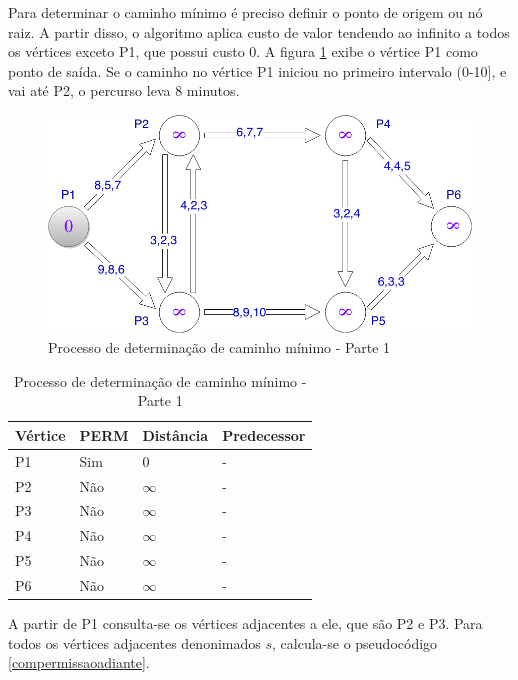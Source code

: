 Para determinar o caminho mínimo é preciso definir o ponto de origem ou nó raiz. A partir disso, o algoritmo
aplica custo de valor tendendo ao infinito a todos os vértices exceto P1, que possui custo 0. A figura \ref{fig:leo2} exibe
o vértice P1 como ponto de saída. Se o caminho no vértice P1 iniciou no primeiro intervalo (0-10], e vai
até P2, o percurso leva 8 minutos.

\begin{figure}[htbp]
\centering
 \includegraphics[width=.50\textwidth]{figuras/leo2.png}
\caption{Processo de determinação de caminho mínimo - Parte 1}
\label{fig:leo2}
\end{figure}

\begin{table}[htbp]
  \centering
  \begin{tabular}{l l l l}
  \toprule
  Vértice & PERM & Distância & Predecessor\\
  \midrule
  P1 & Sim & 0 & - \\
  P2 & Não & $\infty$ & - \\
  P3 & Não & $\infty$ & - \\
  P4 & Não & $\infty$ & - \\
  P5 & Não & $\infty$ & - \\
  P6 & Não & $\infty$ & - \\
  \bottomrule
  \end{tabular}
\caption{Processo de determinação de caminho mínimo - Parte 1}
 \label{tab:leotab1}
\end{table}
\FloatBarrier

A partir de P1 consulta-se os vértices adjacentes a ele, que são P2 e P3. Para todos os vértices
adjacentes denonimados $s$, calcula-se o pseudocódigo \ref{compermissaoadiante}.



